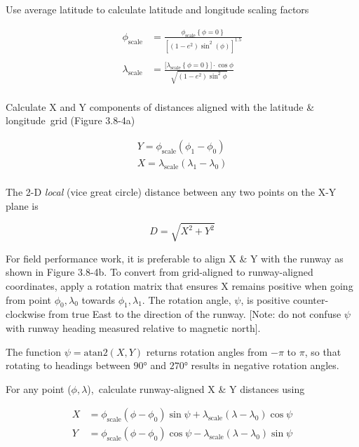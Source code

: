 \documentclass[
]{book}
\begin{document}
Use average latitude to calculate latitude and longitude scaling factors

\[
\begin{align}
\phi_{\mathrm{scale}} &= \frac{\phi_{\mathrm{scale}} \left\{ \phi = 0 \right\} }{ \left\lbrack \left( 1 - e^{2} \right)  \sin^{2}(\phi) \right\rbrack^{1.5} } \\
\\
\lambda_{\mathrm{scale}} &= \frac{\lbrack \lambda_{\mathrm{scale}} \left\{ \phi = 0 \right\} \rbrack \cdot \cos{\phi}}{\sqrt{ \left(1 - e^2 \right) \sin^{2}{\phi}}} \\
\end{align}
\]

Calculate X and Y components of distances aligned with the latitude \& longitude~grid (Figure 3.8-4a)

\[
\begin{align}
Y = \phi_{\mathrm{scale}} \left(\phi_1 - \phi_0 \right) \\
X = \lambda_{\mathrm{scale}} \left(\lambda_1 - \lambda_0 \right) \\
\end{align}
\]

The 2-D \emph{local} (vice great circle) distance between any two points on the X-Y plane is

\[D = \sqrt{X^2 + Y^2} \]

For field performance work, it is preferable to align X \& Y with the runway as shown in Figure 3.8-4b. To convert from grid-aligned to runway-aligned coordinates, apply a rotation matrix that ensures X remains positive when going from point \(\phi_0, \lambda_0\) towards \(\phi_1, \lambda_1\). The rotation angle, \(\psi\), is positive counter-clockwise from true East to the direction of the runway. {[}Note: do not confuse \(\psi\) with runway heading measured relative to magnetic north{]}.

The function \(\psi = \mathrm{atan2} \left( X,Y \right)\) returns rotation angles from \(-\pi\) to \(\pi\), so that rotating to headings between \(90°\) and \(270°\) results in negative rotation angles.

For any point (\(\phi, \lambda\)),~calculate runway-aligned X \& Y distances using

\[
\begin{align}
X &= \phi_{\mathrm{scale}} \left(\phi - \phi_0 \right)\sin{\psi} + \lambda_{\mathrm{scale}} \left(\lambda - \lambda_0 \right)\cos{\psi} \\
Y &= \phi_{\mathrm{scale}} \left(\phi - \phi_0 \right)\cos{\psi} - \lambda_{\mathrm{scale}} \left(\lambda - \lambda_0 \right)\sin{\psi} \\
\end{align}
\]
\end{document}
